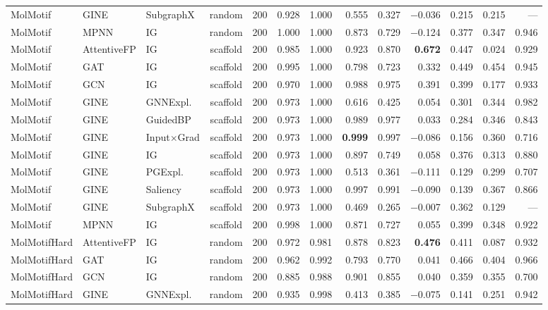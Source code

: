 \begin{table}[t]
{\begin{tabular}{lllcrrrrrrrrr}
MolMotif & GINE & SubgraphX & random & 200 & 0.928 & 1.000 & 0.555 & 0.327 & $-$0.036 & 0.215 & 0.215 & --- \\
MolMotif & MPNN & IG & random & 200 & 1.000 & 1.000 & 0.873 & 0.729 & $-$0.124 & 0.377 & 0.347 & 0.946 \\
\addlinespace[2pt]
MolMotif & AttentiveFP & IG & scaffold & 200 & 0.985 & 1.000 & 0.923 & 0.870 & \textbf{0.672} & 0.447 & 0.024 & 0.929 \\
MolMotif & GAT & IG & scaffold & 200 & 0.995 & 1.000 & 0.798 & 0.723 & 0.332 & 0.449 & 0.454 & 0.945 \\
MolMotif & GCN & IG & scaffold & 200 & 0.970 & 1.000 & 0.988 & 0.975 & 0.391 & 0.399 & 0.177 & 0.933 \\
MolMotif & GINE & GNNExpl. & scaffold & 200 & 0.973 & 1.000 & 0.616 & 0.425 & 0.054 & 0.301 & 0.344 & 0.982 \\
MolMotif & GINE & GuidedBP & scaffold & 200 & 0.973 & 1.000 & 0.989 & 0.977 & 0.033 & 0.284 & 0.346 & 0.843 \\
MolMotif & GINE & Input$\times$Grad & scaffold & 200 & 0.973 & 1.000 & \textbf{0.999} & 0.997 & $-$0.086 & 0.156 & 0.360 & 0.716 \\
MolMotif & GINE & IG & scaffold & 200 & 0.973 & 1.000 & 0.897 & 0.749 & 0.058 & 0.376 & 0.313 & 0.880 \\
MolMotif & GINE & PGExpl. & scaffold & 200 & 0.973 & 1.000 & 0.513 & 0.361 & $-$0.111 & 0.129 & 0.299 & 0.707 \\
MolMotif & GINE & Saliency & scaffold & 200 & 0.973 & 1.000 & 0.997 & 0.991 & $-$0.090 & 0.139 & 0.367 & 0.866 \\
MolMotif & GINE & SubgraphX & scaffold & 200 & 0.973 & 1.000 & 0.469 & 0.265 & $-$0.007 & 0.362 & 0.129 & --- \\
MolMotif & MPNN & IG & scaffold & 200 & 0.998 & 1.000 & 0.871 & 0.727 & 0.055 & 0.399 & 0.348 & 0.922 \\
\addlinespace[2pt]
MolMotifHard & AttentiveFP & IG & random & 200 & 0.972 & 0.981 & 0.878 & 0.823 & \textbf{0.476} & 0.411 & 0.087 & 0.932 \\
MolMotifHard & GAT & IG & random & 200 & 0.962 & 0.992 & 0.793 & 0.770 & 0.041 & 0.466 & 0.404 & 0.966 \\
MolMotifHard & GCN & IG & random & 200 & 0.885 & 0.988 & 0.901 & 0.855 & 0.040 & 0.359 & 0.355 & 0.700 \\
MolMotifHard & GINE & GNNExpl. & random & 200 & 0.935 & 0.998 & 0.413 & 0.385 & $-$0.075 & 0.141 & 0.251 & 0.942 \\

\end{tabular}}
\end{table}
